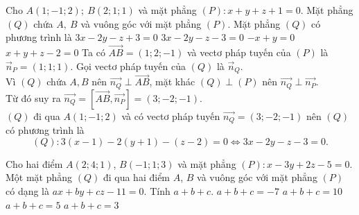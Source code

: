 \begin{ex}%
	Cho $A\left( 1;-1;2 \right);\ B\left( 2;1;1 \right)$ và mặt phẳng $\left( P \right):x+y+z+1=0$. Mặt phẳng $\left( Q \right)$ chứa $A,\ B$ và vuông góc với mặt phẳng $\left( P \right)$. Mặt phẳng $\left( Q \right)$ có phương trình là
	\choice
	{$3x-2y-z+3=0$}
	{\True $3x-2y-z-3=0$}
	{$-x+y=0$}
	{$x+y+z-2=0$}
	\loigiai
	{
		Ta có $\vec{A B}=(1 ; 2 ;-1)$ và vectơ pháp tuyến của $(P)$ là $\vec{n}_{P}=(1 ; 1 ; 1)$. Gọi vectơ pháp tuyến của $(Q)$ là $\vec{n}_{Q}$.\\
		Vì $(Q)$ chứa $A,B$ nên $\vec{n_{Q}} \perp \vec{A B}$, mặt khác $(Q) \perp(P)$ nên $\vec{n_{Q}} \perp \vec{n_{P}}$. \\
		Từ đó suy ra $\vec{n_{Q}}=\left[\vec{A B}, \vec{n_{P}}\right]=(3 ;-2 ;-1)$.\\
		$(Q)$ đi qua $A(1;-1;2)$ và có vectơ pháp tuyến $\vec{n_{Q}}=(3 ;-2 ;-1)$ nên $(Q)$ có phương trình là
		$$(Q):3(x-1)-2(y+1)-(z-2)=0 \Leftrightarrow 3 x-2 y-z-3=0.$$
	}
\end{ex}

\begin{ex}%
	Cho hai điểm $A(2;4;1)$, $B(-1;1;3)$ và mặt phẳng $(P)\colon x-3y+2z-5=0$. Một mặt phẳng $(Q)$ đi qua hai điểm $A$, $B$ và vuông góc với mặt phẳng $(P)$ có dạng là $ax+by+cz-11=0$. Tính $a+b+c$.
	\choice
	{$a+b+c=-7$}
	{$a+b+c=10$}
	{\True $a+b+c=5$}
	{$a+b+c=3$}
\end{ex}


